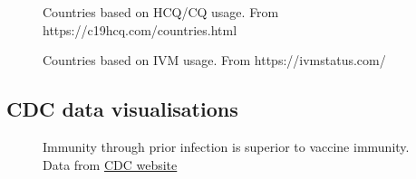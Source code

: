 \documentclass[11pt,a4paper,notitlepage]{report}
\begin{document}
\begin{figure}[h]
    \centering
    \caption{Countries based on HCQ/CQ usage. From https://c19hcq.com/countries.html}
    \label{fig:hydroxychloroquine-countries}
\end{figure}

\begin{figure}[h]
    \centering
    \caption{Countries based on IVM usage. From https://ivmstatus.com/}
    \label{fig:ivermectin-countries}
\end{figure}

\clearpage

\subsection*{CDC data visualisations}

\begin{figure}[h]
    \centering
    \caption{Immunity through prior infection is superior to vaccine immunity. Data from \href{https://www.cdc.gov/mmwr/volumes/71/wr/mm7104e1.htm}{CDC website} \cite{cdc28012020}}
    \label{fig:CDC-natural-immunity}
\end{figure}








 
 
\end{document}
